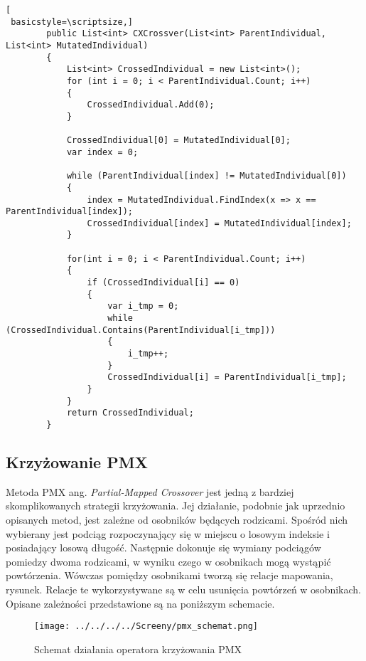 \begin{program}[h!]
\begin{lstlisting}[
 basicstyle=\scriptsize,]
        public List<int> CXCrossver(List<int> ParentIndividual, List<int> MutatedIndividual)
        {
            List<int> CrossedIndividual = new List<int>();
            for (int i = 0; i < ParentIndividual.Count; i++)
            {
                CrossedIndividual.Add(0);
            }

            CrossedIndividual[0] = MutatedIndividual[0];
            var index = 0;

            while (ParentIndividual[index] != MutatedIndividual[0])
            {
                index = MutatedIndividual.FindIndex(x => x == ParentIndividual[index]);
                CrossedIndividual[index] = MutatedIndividual[index];
            }

            for(int i = 0; i < ParentIndividual.Count; i++)
            {
                if (CrossedIndividual[i] == 0)
                {
                    var i_tmp = 0;
                    while (CrossedIndividual.Contains(ParentIndividual[i_tmp]))
                    {
                        i_tmp++;
                    }
                    CrossedIndividual[i] = ParentIndividual[i_tmp];
                }
            }
            return CrossedIndividual;
        }
\end{lstlisting}
\end{program}

\subsection{Krzyżowanie PMX}\label{sec:kompilacja}

Metoda PMX ang. \textit{Partial-Mapped Crossover} jest jedną z bardziej skomplikowanych strategii krzyżowania. Jej działanie, podobnie jak uprzednio opisanych metod, jest zależne od osobników będących rodzicami. Spośród nich wybierany jest podciąg rozpoczynający się w miejscu o losowym indeksie i posiadający losową długość. Następnie dokonuje się wymiany podciągów pomiedzy dwoma rodzicami, w wyniku czego w osobnikach mogą wystąpić powtórzenia. Wówczas pomiędzy osobnikami tworzą się relacje mapowania, rysunek. Relacje te wykorzystywane są w celu usunięcia powtórzeń w osobnikach. Opisane zależności przedstawione są na poniższym schemacie.

\begin{figure}[h!]
\centering
		\texttt{[image: ../../../../Screeny/pmx\_schemat.png]}
		\caption{Schemat działania operatora krzyżowania PMX}
		\label{schematCX}			
\end{figure}

